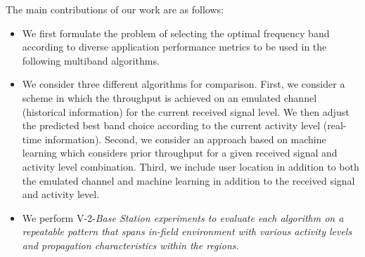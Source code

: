 


The main contributions of our work are as follows:
\begin{itemize}
\item We first formulate the problem of selecting the optimal 
frequency band according to diverse application performance metrics
to be used in the following multiband algorithms.
\item We consider three different algorithms for comparison.  First, we consider a scheme
in which the throughput is achieved on an emulated channel (historical information) for
the current received signal level. We then adjust the predicted best band choice according to the current activity
level (real-time information). 
Second, we consider an approach based on machine learning which
considers prior throughput for a given received signal and activity level
combination.  
Third, we include user location in addition to both the emulated channel and machine learning in addition to the received signal and activity level.
\item We perform V-2-\it{Base Station} experiments to evaluate each algorithm on a repeatable pattern that
spans in-field environment with various activity
levels and propagation characteristics within the regions. 
\end{itemize}



